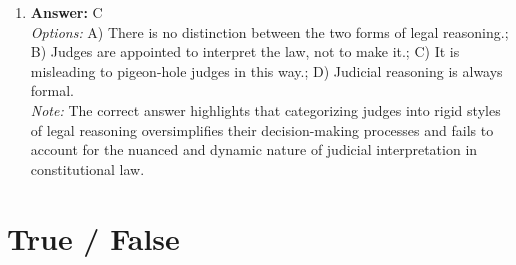 \documentclass[12pt]{article}
\begin{document}
\begin{enumerate}[label=\arabic*.]
\item \textbf{Answer:} C
\\ \textit{Options:} A) There is no distinction between the two forms of legal reasoning.; B) Judges are appointed to interpret the law, not to make it.; C) It is misleading to pigeon-hole judges in this way.; D) Judicial reasoning is always formal.
\\ \textit{Note:} The correct answer highlights that categorizing judges into rigid styles of legal reasoning oversimplifies their decision-making processes and fails to account for the nuanced and dynamic nature of judicial interpretation in constitutional law.
\end{enumerate}

\section*{True / False}
\end{document}
